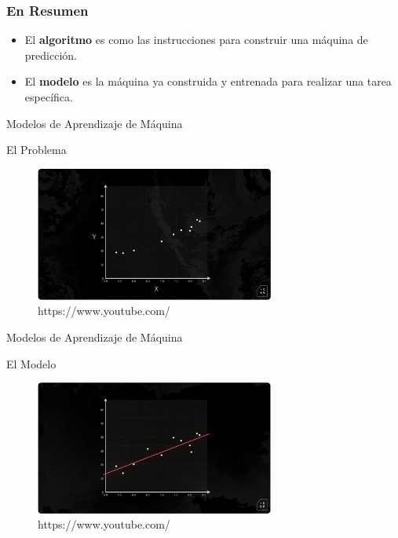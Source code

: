 \documentclass{beamer}
\begin{document}
	
\begin{frame}
	\frametitle{En Resumen}
	\begin{itemize}
		\item El \textbf{algoritmo} es como las instrucciones para construir una máquina de predicción.
		\item El \textbf{modelo} es la máquina ya construida y entrenada para realizar una tarea específica.
	\end{itemize}
\end{frame}
	

	

\begin{frame}{Modelos de Aprendizaje de Máquina}
\begin{block}{El Problema}
	\begin{figure}
		\includegraphics[width=0.7\textwidth]{modelo-algoritmo_1}
		\caption{https://www.youtube.com/}
		\centering
	\end{figure}
\end{block}
		
\end{frame}
	
\begin{frame}{Modelos de Aprendizaje de Máquina}
\begin{block}{El Modelo}
	\begin{figure}
		\includegraphics[width=0.7\textwidth]{modelo-algoritmo_2}
		\caption{https://www.youtube.com/}
		\centering
	\end{figure}
\end{block}
		
\end{frame}
	
\end{document}
